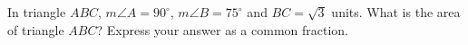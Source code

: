 In triangle $ABC$, $m\angle A=90^\circ$, $m\angle B=75^\circ$ and $BC=\sqrt3$ units. What is the area of triangle $ABC$? Express your answer as a common fraction.
